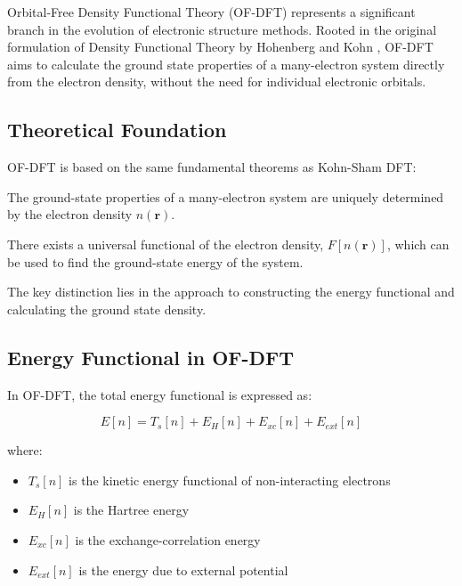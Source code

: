 Orbital-Free Density Functional Theory (OF-DFT) represents a significant branch in the evolution of electronic structure methods. Rooted in the original formulation of Density Functional Theory by Hohenberg and Kohn \cite{HohenbergKohn1964}, OF-DFT aims to calculate the ground state properties of a many-electron system directly from the electron density, without the need for individual electronic orbitals.

\subsection{Theoretical Foundation}

OF-DFT is based on the same fundamental theorems as Kohn-Sham DFT:

\begin{theorem}
The ground-state properties of a many-electron system are uniquely determined by the electron density $n(\mathbf{r})$.
\end{theorem}

\begin{theorem}
There exists a universal functional of the electron density, $F[n(\mathbf{r})]$, which can be used to find the ground-state energy of the system.
\end{theorem}

The key distinction lies in the approach to constructing the energy functional and calculating the ground state density.

\subsection{Energy Functional in OF-DFT}

In OF-DFT, the total energy functional is expressed as:

\begin{equation}
E[n] = T_s[n] + E_H[n] + E_{xc}[n] + E_{ext}[n]
\end{equation}

where:
\begin{itemize}
    \item $T_s[n]$ is the kinetic energy functional of non-interacting electrons
    \item $E_H[n]$ is the Hartree energy
    \item $E_{xc}[n]$ is the exchange-correlation energy
    \item $E_{ext}[n]$ is the energy due to external potential
\end{itemize}

